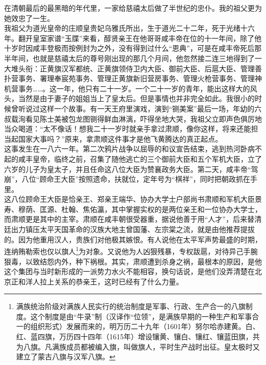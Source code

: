   在清朝最后的最黑暗的年代里，一家给慈禧太后做了半世纪的忠仆。我的祖父更为她效忠了一生。\\

  我祖父为道光皇帝的庄顺皇贵妃乌雅氏所出，生于道光二十二年，死于光绪十六年。翻开皇室家谱“玉牒”来看，醇贤亲王在他哥哥咸丰帝在位的十一年间，除了他十岁时因咸丰登极而按例封为之外，没有得到过什么“恩典”，可是在咸丰帝死后那半年间，也就是慈禧太后的尊号刚出现的那几个月间，他忽然接二连三地得到了一大堆头衔：正黄旗汉军都统、正黄旗领侍卫内大臣、御前大臣、后扈大臣、管理善扑营事务、署理奉宸苑事务、管理正黄旗新旧营房事务、管理火枪营事务、管理神机营事务……。这一年，他只有二十一岁。一个二十一岁的青年，能出这样大的风头，当然是由于妻子的姐姐当上了皇太后。但是事情也并非完全如此。我很小的时候曾听说过这样一个故事。有一天王府里演戏，演到“铡美案”最后一场，年幼的六叔载洵看见陈士美被包龙图铡得鲜血淋漓，吓得坐地大哭，我祖父立即声色俱厉地当众喝道：“太不像话！想我二十一岁时就亲手拿过肃顺，像你这样，将来还能担当起国家大事吗？”原来，拿肃顺这件事才是他飞黄腾达的真正起点。\\

  这事发生在一八六一年。第二次鸦片战争以屈辱的和议宣告结束，逃到热河卧病不起的咸丰皇帝，临终之前，召集了随他逃亡的三个御前大臣和五个军机大臣，立了六岁的儿子为皇太子，并且任命这八位大臣为赞襄政务大臣。第二天，咸丰帝“驾崩”，八位“顾命王大臣”按照遗命，扶就位，定年号为“棋祥”，同时把朝政抓在手里。\\

  这八位顾命王大臣是恰亲王、郑亲王端华、协办大学士户部尚书肃顺和军机大臣景寿、穆荫、匡源、杜翰、焦佑瀛，其中掌握实权的是两位亲王和一位协办大学士，而肃顺更是其中的主宰。肃顺在咸丰朝很受器重，据说他善于用“人才”，后来替清廷出力镇压太平天国革命的汉族大地主曾国藩、左宗棠之流，就是由他推荐提拔的。因为他重用汉人，贵族们对他极其嫉恨。有人说他在太平军声势最盛的时期，连纳贿勒索也仅以旗人\footnote{满族统治阶级对满族人民实行的统治制度是军事、行政、生产合一的八旗制度。这个制度是由“牛录”制（汉译作“位领”，是满族早期的一种生产和军事合一的组织形式）发展而来的，明万历二十九年（1601年）努尔哈赤建黄。白、红、蓝四旗，万历四十四年（1615年）增设镶黄、镶白、镶红、镶蓝田旗，共为八旗。凡满族成员都被编入旗，叫做旗人，平时生产战时出征。皇太极时又建立了蒙古八旗与汉军八旗。}为对象。又说他为人凶狠残暴，专权跋扈，对待异己手腕狠毒，以致结怨内外，种下祸根。其实，肃顺遭到杀身之祸，最根本的原因，是他这个集团与当时新形成的一派势力水火不能相容，换句话说，是他们没弄清楚在北京正和洋人拉上关系的恭亲王，这时已经有了什么力量。\\


